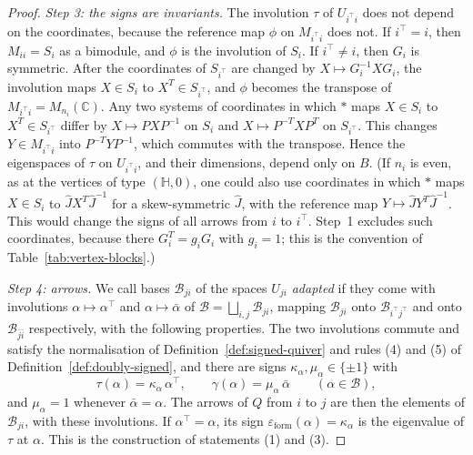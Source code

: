 \documentclass[12pt, a4paper]{report}
\theoremstyle{plain}
\theoremstyle{definition}
\theoremstyle{remark}
\theoremstyle{plain}
\newcommand{\epsilonform}{\varepsilon_{\mathrm{form}}}
\newcommand{\CC}{\mathbb{C}}
\newcommand{\HH}{\mathbb{H}}
\begin{document}
\begin{proof}
\emph{Step 3: the signs are invariants.} The involution $\tau$ of $U_{i^{\top}i}$ does not depend on the coordinates, because the reference map $\phi$ on $M_{i^{\top}i}$ does not. If $i^{\top}=i$, then $M_{ii}=S_i$ as a bimodule, and $\phi$ is the involution of $S_i$. If $i^{\top}\neq i$, then $G_i$ is symmetric. After the coordinates of $S_{i^{\top}}$ are changed by $X\mapsto G_i^{-1}XG_i$, the involution maps $X\in S_i$ to $X^T\in S_{i^{\top}}$, and $\phi$ becomes the transpose of $M_{i^{\top}i}=M_{n_i}(\CC)$. Any two systems of coordinates in which $*$ maps $X\in S_i$ to $X^T\in S_{i^{\top}}$ differ by $X\mapsto PXP^{-1}$ on $S_i$ and $X\mapsto P^{-T}XP^T$ on $S_{i^{\top}}$. This changes $Y\in M_{i^{\top}i}$ into $P^{-T}YP^{-1}$, which commutes with the transpose. Hence the eigenspaces of $\tau$ on $U_{i^{\top}i}$, and their dimensions, depend only on $B$. (If $n_i$ is even, as at the vertices of type $(\HH,0)$, one could also use coordinates in which $*$ maps $X\in S_i$ to $\hat JX^T\hat J^{-1}$ for a skew-symmetric $\hat J$, with the reference map $Y\mapsto\hat JY^T\hat J^{-1}$. This would change the signs of all arrows from $i$ to $i^{\top}$. Step~1 excludes such coordinates, because there $G_i^T=g_iG_i$ with $g_i=1$; this is the convention of Table~\ref{tab:vertex-blocks}.)

\emph{Step 4: arrows.} We call bases $\mathcal B_{ji}$ of the spaces $U_{ji}$ \emph{adapted} if they come with involutions $\alpha\mapsto\alpha^{\top}$ and $\alpha\mapsto\bar\alpha$ of $\mathcal B=\bigsqcup_{i,j}\mathcal B_{ji}$, mapping $\mathcal B_{ji}$ onto $\mathcal B_{i^{\top}j^{\top}}$ and onto $\mathcal B_{\bar j\bar i}$ respectively, with the following properties. The two involutions commute and satisfy the normalisation of Definition~\ref{def:signed-quiver} and rules (4) and (5) of Definition~\ref{def:doubly-signed}, and there are signs $\kappa_\alpha,\mu_\alpha\in\{\pm1\}$ with
\[ \tau(\alpha)=\kappa_\alpha\,\alpha^{\top},\qquad \gamma(\alpha)=\mu_\alpha\,\bar\alpha\qquad(\alpha\in\mathcal B), \]
and $\mu_\alpha=1$ whenever $\bar\alpha=\alpha$. The arrows of $Q$ from $i$ to $j$ are then the elements of $\mathcal B_{ji}$, with these involutions. If $\alpha^{\top}=\alpha$, its sign $\epsilonform(\alpha)=\kappa_\alpha$ is the eigenvalue of $\tau$ at $\alpha$. This is the construction of statements (1) and (3).


\end{proof}
\end{document}
